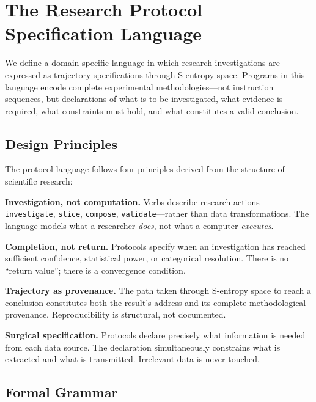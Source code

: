 \documentclass[10pt,twocolumn]{article}
\theoremstyle{definition}
\theoremstyle{remark}
\begin{document}
\section{The Research Protocol Specification Language}
\label{sec:protocol}

We define a domain-specific language \cite{fowler2010,mernik2005} in which research investigations are expressed as trajectory specifications through S-entropy space. Programs in this language encode complete experimental methodologies---not instruction sequences, but declarations of what is to be investigated, what evidence is required, what constraints must hold, and what constitutes a valid conclusion.

\subsection{Design Principles}

The protocol language follows four principles derived from the structure of scientific research:

\textbf{Investigation, not computation.} Verbs describe research actions---\texttt{investigate}, \texttt{slice}, \texttt{compose}, \texttt{validate}---rather than data transformations. The language models what a researcher \emph{does}, not what a computer \emph{executes}.

\textbf{Completion, not return.} Protocols specify when an investigation has reached sufficient confidence, statistical power, or categorical resolution. There is no ``return value''; there is a convergence condition.

\textbf{Trajectory as provenance.} The path taken through S-entropy space to reach a conclusion constitutes both the result's address and its complete methodological provenance. Reproducibility is structural, not documented.

\textbf{Surgical specification.} Protocols declare precisely what information is needed from each data source. The declaration simultaneously constrains what is extracted and what is transmitted. Irrelevant data is never touched.

\subsection{Formal Grammar}
\end{document}
